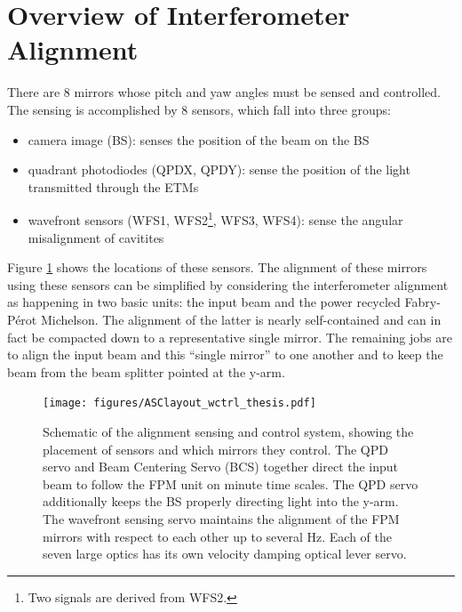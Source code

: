 \section{Overview of Interferometer Alignment}
\label{sec:alignment_overview}

There are 8 mirrors whose pitch and yaw angles must be sensed and controlled. The sensing is accomplished by 8 sensors, which fall into three groups:
\begin{itemize}
\item camera image (BS): senses the position of the beam on the BS \vspace{-10pt}
\item quadrant photodiodes (QPDX, QPDY): sense the position of the light transmitted through the ETMs \vspace{-10pt}
\item wavefront sensors (WFS1, WFS2\footnote{Two signals are derived from WFS2.}, WFS3, WFS4): sense the angular misalignment of cavitites 
\end{itemize}
Figure \ref{fig:ASClayout} shows the locations of these sensors.
The alignment of these mirrors using these sensors can be simplified by considering the interferometer alignment as happening in two basic units: the input beam and the power recycled Fabry-P\'{e}rot Michelson. The alignment of the latter is nearly self-contained and can in fact be compacted down to a representative single mirror. The remaining jobs are to align the input beam and this ``single mirror'' to one another and to keep the beam from the beam splitter pointed at the y-arm.

\begin{figure} 
\begin{centering} 
\texttt{[image: figures/ASClayout\_wctrl\_thesis.pdf]} 
\caption[Schematic of the alignment sensing and control system]{Schematic of the alignment sensing and control system, showing the placement of sensors and which mirrors they control. The QPD servo and Beam Centering Servo (BCS) together direct the input beam to follow the FPM unit on minute time scales. The QPD servo additionally keeps the BS properly directing light into the y-arm. The wavefront sensing servo maintains the alignment of the FPM mirrors with respect to each other up to several Hz. Each of the seven large optics has its own velocity damping optical lever servo.}
\label{fig:ASClayout}
\end{centering}
\end{figure}

